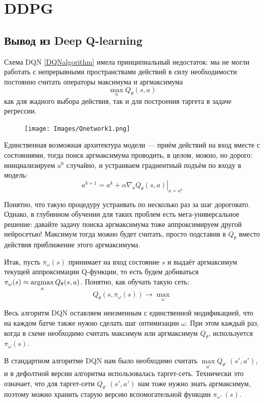 
\section{DDPG}\label{DDPGsection}

\subsection{Вывод из Deep Q-learning}

Схема DQN \ref{DQNalgorithm} имела принципиальный недостаток: мы не могли работать с непрерывными пространствами действий в силу необходимости постоянно считать операторы максимума и аргмаксимума
$$\max_a Q_{\theta}(s, a)$$
как для жадного выбора действия, так и для построения таргета в задаче регрессии. 

\begin{figure}
\vspace{-0.3cm}
\centering
\texttt{[image: Images/Qnetwork1.png]}
\vspace{-0.3cm}
\end{figure}

Единственная возможная архитектура модели --- приём действий на вход вместе с состояниями, тогда поиск аргмаксимума проводить, в целом, можно, но дорого: инициализируем $a^0$ случайно, и устраиваем градиентный подъём по входу в модель:
$$a^{k+1} = a^k + \alpha \left. \nabla_a Q_{\theta}(s, a) \right|_{a = a^k}$$

Понятно, что такую процедуру устраивать по несколько раз за шаг дороговато. Однако, в глубинном обучении для таких проблем есть мега-универсальное решение: давайте задачу поиска аргмаксимума тоже аппроксимируем другой нейросетью! Максимум тогда можно будет считать, просто подставив в $Q_{\theta}$ вместо действия приближение этого аргмаксимума.

Итак, пусть $\pi_{\omega}(s)$ принимает на вход состояние $s$ и выдаёт аргмаксимум текущей аппроксимации Q-функции, то есть будем добиваться $\pi_{\omega}(s) \HM\approx \argmax\limits_a Q_{\theta}(s, a)$. Понятно, как обучать такую сеть:
$$Q_\theta(s, \pi_{\omega}(s)) \to \max_{\omega}$$

Весь алгоритм DQN оставляем неизменным с единственной модификацией, что на каждом батче также нужно сделать шаг оптимизации $\omega$. При этом каждый раз, когда в схеме необходимо считать максимум или аргмаксимум $Q_\theta$, используется $\pi_{\omega}(s)$.

В стандартном алгоритме DQN нам было необходимо считать $\max\limits_{a'} Q_{\theta^{-}}(s', a')$, и в дефолтной версии алгоритма использовалась таргет-сеть. Технически это означает, что для таргет-сети $Q_{\theta^{-}}(s', a')$ нам тоже нужно знать аргмаксимум, поэтому можно хранить старую версию вспомогательной функции $\pi_{\omega^{-}}(s)$. 

